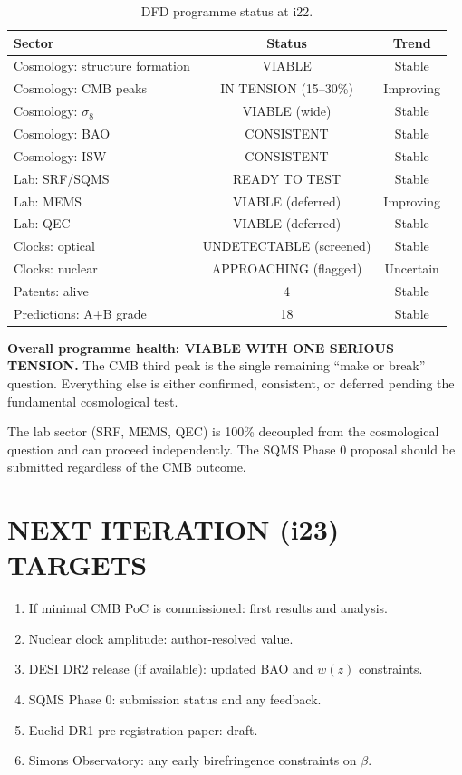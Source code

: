 \documentclass[11pt]{article}
\begin{document}
\begin{table}[h]
\centering
\caption{DFD programme status at i22.}
\begin{tabular}{lcc}
\toprule
\textbf{Sector} & \textbf{Status} & \textbf{Trend} \\
\midrule
Cosmology: structure formation & VIABLE & Stable \\
Cosmology: CMB peaks & IN TENSION (15--30\%) & Improving \\
Cosmology: $\sigma_8$ & VIABLE (wide) & Stable \\
Cosmology: BAO & CONSISTENT & Stable \\
Cosmology: ISW & CONSISTENT & Stable \\
Lab: SRF/SQMS & READY TO TEST & Stable \\
Lab: MEMS & VIABLE (deferred) & Improving \\
Lab: QEC & VIABLE (deferred) & Stable \\
Clocks: optical & UNDETECTABLE (screened) & Stable \\
Clocks: nuclear & APPROACHING (flagged) & Uncertain \\
Patents: alive & 4 & Stable \\
Predictions: A+B grade & 18 & Stable \\
\bottomrule
\end{tabular}
\end{table}

\textbf{Overall programme health: VIABLE WITH ONE SERIOUS TENSION.}
The CMB third peak is the single remaining ``make or break'' question.
Everything else is either confirmed, consistent, or deferred pending
the fundamental cosmological test.

The lab sector (SRF, MEMS, QEC) is 100\% decoupled from the cosmological
question and can proceed independently.  The SQMS Phase 0 proposal
should be submitted regardless of the CMB outcome.


\section{NEXT ITERATION (i23) TARGETS}

\begin{enumerate}
\item If minimal CMB PoC is commissioned: first results and analysis.
\item Nuclear clock amplitude: author-resolved value.
\item DESI DR2 release (if available): updated BAO and $w(z)$ constraints.
\item SQMS Phase 0: submission status and any feedback.
\item Euclid DR1 pre-registration paper: draft.
\item Simons Observatory: any early birefringence constraints on $\beta$.
\end{enumerate}
\end{document}

